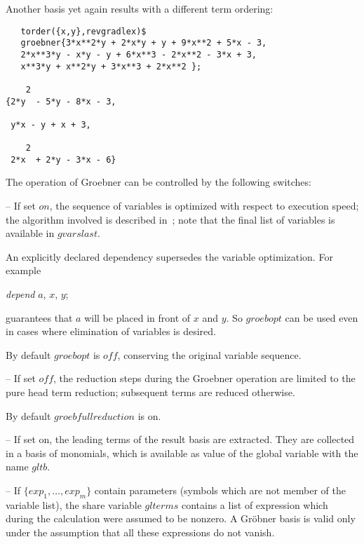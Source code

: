 Another basis yet again results with a different term ordering:
\begin{verbatim}
   torder({x,y},revgradlex)$
   groebner{3*x**2*y + 2*x*y + y + 9*x**2 + 5*x - 3,
   2*x**3*y - x*y - y + 6*x**3 - 2*x**2 - 3*x + 3,
   x**3*y + x**2*y + 3*x**3 + 2*x**2 };

    2
{2*y  - 5*y - 8*x - 3,

 y*x - y + x + 3,

    2
 2*x  + 2*y - 3*x - 6}

\end{verbatim}


The operation of Groebner can be controlled by the following
switches:
\begin{description}
\item[groebopt] -- If set $on$, the sequence of variables is optimized
with respect to execution speed; the algorithm involved is described
in~\cite{Boege:86}; note that the final list of variables is available in
$gvarslast$.

An explicitly declared dependency supersedes the
variable optimization. For example
\begin{center}
{\it depend} $a$, $x$, $y$;
\end{center}
guarantees that $a$ will be placed in front of $x$ and $y$. So
$groebopt$ can be used even in cases where elimination of variables is
desired.

By default $groebopt$ is $off$, conserving the original variable
sequence.

\item[$groebfullreduction$] -- If set $off$, the reduction steps during
the \linebreak[4] Groebner operation are limited to the pure head
term reduction; subsequent terms are reduced otherwise.

By default $groebfullreduction$ is on.

\item[$gltbasis$] -- If set on, the leading terms of the result basis are
extracted. They are collected in a basis of monomials, which is
available as value of the global variable with the name $gltb$.

\item[$glterms$] -- If $\{exp_1, \ldots , exp_m\} $ contain parameters
(symbols which are not member of the variable list), the share variable
{\tt $glterms$} contains a list of expression which during the
calculation were assumed to be nonzero. A Gr\"obner basis
is valid only under the assumption that all these expressions do
not vanish.

\end{description}

